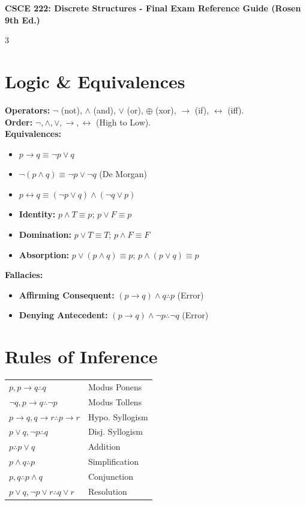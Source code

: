 \documentclass[10pt]{article}
\begin{document}
\scriptsize

\begin{center}
    \textbf{CSCE 222: Discrete Structures - Final Exam Reference Guide (Rosen 9th Ed.)}
\end{center}

\begin{multicols}{3}

\section{Logic \& Equivalences}
\textbf{Operators:} $\neg$ (not), $\land$ (and), $\lor$ (or), $\oplus$ (xor), $\rightarrow$ (if), $\leftrightarrow$ (iff). \\
\textbf{Order:} $\neg, \land, \lor, \rightarrow, \leftrightarrow$ (High to Low). \\
\textbf{Equivalences:}
\begin{itemize}
    \item $p \rightarrow q \equiv \neg p \lor q$
    \item $\neg(p \land q) \equiv \neg p \lor \neg q$ (De Morgan)
    \item $p \leftrightarrow q \equiv (\neg p \lor q) \land (\neg q \lor p)$
    \item \textbf{Identity:} $p \land T \equiv p$; $p \lor F \equiv p$
    \item \textbf{Domination:} $p \lor T \equiv T$; $p \land F \equiv F$
    \item \textbf{Absorption:} $p \lor (p \land q) \equiv p$; $p \land (p \lor q) \equiv p$
\end{itemize}

\textbf{Fallacies:}
\begin{itemize}
    \item \textbf{Affirming Consequent:} $(p \rightarrow q) \land q \therefore p$ (Error)
    \item \textbf{Denying Antecedent:} $(p \rightarrow q) \land \neg p \therefore \neg q$ (Error)
\end{itemize}

\section{Rules of Inference}
\begin{tabular}{ll}
    $p, p \rightarrow q \therefore q$ & Modus Ponens \\
    $\neg q, p \rightarrow q \therefore \neg p$ & Modus Tollens \\
    $p \rightarrow q, q \rightarrow r \therefore p \rightarrow r$ & Hypo. Syllogism \\
    $p \lor q, \neg p \therefore q$ & Disj. Syllogism \\
    $p \therefore p \lor q$ & Addition \\
    $p \land q \therefore p$ & Simplification \\
    $p, q \therefore p \land q$ & Conjunction \\
    $p \lor q, \neg p \lor r \therefore q \lor r$ & Resolution
\end{tabular}


\end{multicols}
\end{document}
